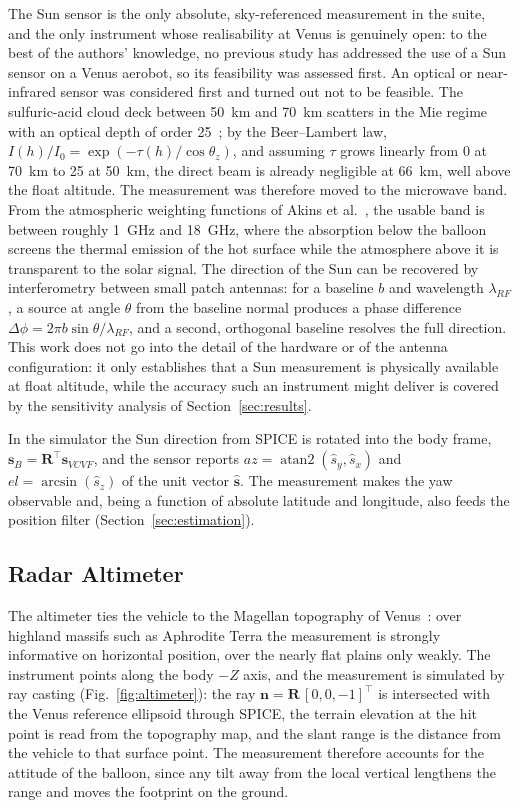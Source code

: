 \documentclass[preprint,12pt,a4paper]{elsarticle}
\begin{document}
The Sun sensor is the only absolute, sky-referenced measurement in the suite, and the only
instrument whose realisability at Venus is genuinely open: to the best of the authors'
knowledge, no previous study has addressed the use of a Sun sensor on a Venus aerobot, so
its feasibility was assessed first.
An optical or near-infrared sensor was considered first and turned out not to be feasible.
The sulfuric-acid cloud deck between \SI{50}{km} and \SI{70}{km} scatters in the Mie regime
with an optical depth of order 25~\cite{Davis2024}; by the Beer--Lambert law,
$I(h)/I_0=\exp(-\tau(h)/\cos\theta_z)$, and assuming $\tau$ grows linearly from 0 at
\SI{70}{km} to 25 at \SI{50}{km}, the direct beam is already negligible at \SI{66}{km}, well
above the float altitude.
The measurement was therefore moved to the microwave band.
From the atmospheric weighting functions of Akins et al.~\cite{Akins2017}, the usable band
is between roughly \SI{1}{GHz} and \SI{18}{GHz}, where the absorption below the balloon
screens the thermal emission of the hot surface while the atmosphere above it is
transparent to the solar signal.
The direction of the Sun can be recovered by interferometry between small patch antennas:
for a baseline $b$ and wavelength $\lambda_{RF}$, a source at angle $\theta$ from the
baseline normal produces a phase difference $\Delta\phi=2\pi b\sin\theta/\lambda_{RF}$, and
a second, orthogonal baseline resolves the full direction.
This work does not go into the detail of the hardware or of the antenna configuration: it
only establishes that a Sun measurement is physically available at float altitude, while
the accuracy such an instrument might deliver is covered by the sensitivity analysis of
Section~\ref{sec:results}.

In the simulator the Sun direction from SPICE is rotated into the body frame, $\mathbf{s}_B=\mathbf{R}^\top\mathbf{s}_{VCVF}$, and the sensor
reports $az=\operatorname{atan2}(\hat s_y,\hat s_x)$ and $el=\arcsin(\hat s_z)$ of the unit
vector $\hat{\mathbf{s}}$.
The measurement makes the yaw observable and, being a function of absolute latitude and
longitude, also feeds the position filter (Section~\ref{sec:estimation}).

\subsection{Radar Altimeter}

The altimeter ties the vehicle to the Magellan topography of Venus~\cite{Ford1992}: over
highland massifs such as Aphrodite Terra the measurement is strongly informative on
horizontal position, over the nearly flat plains only weakly.
The instrument points along the body $-Z$ axis, and the measurement is simulated by ray
casting (Fig.~\ref{fig:altimeter}): the ray
$\mathbf{n}=\mathbf{R}\,[0,0,-1]^\top$ is intersected with the Venus reference ellipsoid
through SPICE, the terrain elevation at the hit point is read from the topography map, and
the slant range is the distance from the vehicle to that surface point.
The measurement therefore accounts for the attitude of the balloon, since any tilt away from
the local vertical lengthens the range and moves the footprint on the ground.
\end{document}
